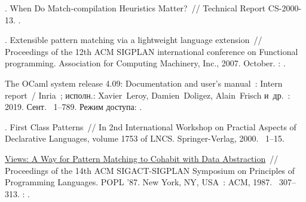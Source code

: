 \begin{thebibliography}{10}
. When Do Match-compilation Heuristics
  Matter?~// Technical Report CS-2000-13. \BibDash
{}.

. Extensible pattern
  matching via a lightweight language extension~// Proceedings of the 12th ACM
  SIGPLAN international conference on Functional programming. \BibDash
\newblock Association for Computing Machinery, Inc., 2007. \BibDash October.
  \BibDash
{}:
  .

{The OCaml system release 4.09: Documentation and user's manual}~: Intern
  report~/ {Inria}~; {исполн.}: Xavier~Leroy, Damien~Doligez,
  Alain~Frisch и~др.~: 2019. \BibDash Сент. \BibDash
{}~1--789. {Режим доступа}:
  .

. First Class Patterns~// In 2nd International Workshop
  on Practial Aspects of Declarative Languages, volume 1753 of LNCS. \BibDash
\newblock Springer-Verlag, 2000. \BibDash
{}~1--15.

 \href{http://dx.doi.org/10.1145/41625.41653}{Views: A Way
  for Pattern Matching to Cohabit with Data Abstraction}~// Proceedings of the
  14th ACM SIGACT-SIGPLAN Symposium on Principles of Programming Languages.
  \BibDash
\newblock POPL '87. \BibDash
\newblock New York, NY, USA~: ACM, 1987. \BibDash
{}~307--313. \BibDash
{}:
  .

\end{thebibliography}

